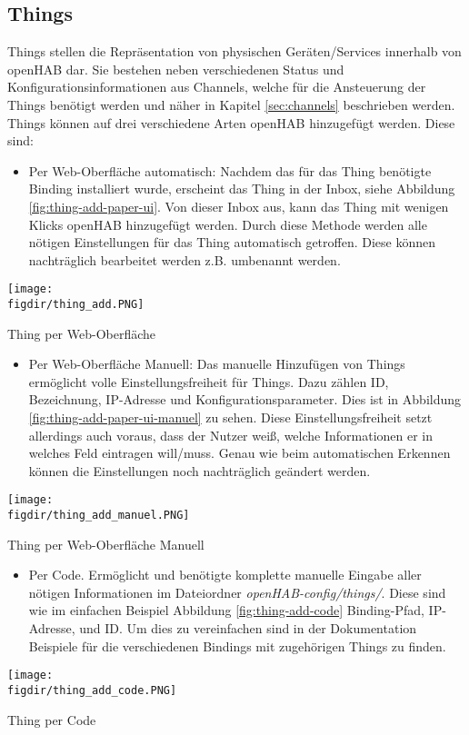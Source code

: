 \subsection{Things}
Things stellen die Repräsentation von physischen Geräten/Services innerhalb von openHAB dar. Sie bestehen neben verschiedenen Status und Konfigurationsinformationen aus Channels, welche für die Ansteuerung der Things benötigt werden und näher in Kapitel \ref{sec:channels} beschrieben werden.
Things können auf drei verschiedene Arten openHAB hinzugefügt werden. Diese sind:
\begin{itemize}
	\item Per Web-Oberfläche automatisch: Nachdem das für das Thing benötigte Binding installiert wurde, erscheint das Thing in der Inbox, siehe Abbildung \ref{fig:thing-add-paper-ui}. Von dieser Inbox aus, kann das Thing mit wenigen Klicks openHAB hinzugefügt werden. Durch diese Methode werden alle nötigen Einstellungen für das Thing automatisch getroffen. Diese können nachträglich bearbeitet werden z.B. umbenannt werden. 
\end{itemize}
{\centering
\captionsetup{type=figure}
\texttt{[image: \\figdir/thing\_add.PNG]}
\caption{Thing per Web-Oberfläche \label{fig:thing-add-paper-ui}}
}	
\begin{itemize}	
	\item Per Web-Oberfläche Manuell: Das manuelle Hinzufügen von Things ermöglicht volle Einstellungsfreiheit für Things. Dazu zählen ID, Bezeichnung, IP-Adresse und Konfigurationsparameter. Dies ist in Abbildung \ref{fig:thing-add-paper-ui-manuel} zu sehen. Diese Einstellungsfreiheit setzt allerdings auch voraus, dass der Nutzer weiß, welche Informationen er in welches Feld eintragen will/muss. Genau wie beim automatischen Erkennen können die Einstellungen noch nachträglich geändert werden. 
\end{itemize}
{
	\centering
	\captionsetup{type=figure}
	\texttt{[image: \\figdir/thing\_add\_manuel.PNG]}
	\caption{Thing per Web-Oberfläche Manuell \label{fig:thing-add-paper-ui-manuel}}
}
\begin{itemize}	
	\item Per Code. Ermöglicht und benötigte komplette manuelle Eingabe aller nötigen Informationen im Dateiordner  \textit{openHAB-config/things/}. Diese sind wie im einfachen Beispiel Abbildung \ref{fig:thing-add-code} Binding-Pfad, IP-Adresse, und ID. Um dies zu vereinfachen sind in der Dokumentation Beispiele für die verschiedenen Bindings mit zugehörigen Things zu finden.
\end{itemize}
{
	\centering
	\captionsetup{type=figure}
	\texttt{[image: \\figdir/thing\_add\_code.PNG]}
	\caption{Thing per Code \label{fig:thing-add-code}}
}

